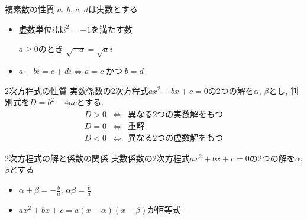 \documentclass[aspectratio=169, 12pt]{beamer} %
\begin{document}
\begin{frame}{複素数の性質}
    $a$, $b$, $c$, $d$は実数とする
    \begin{itemize}
        \item 虚数単位$i$は$i^2=-1$を満たす数 \par
              $a\geq 0$のとき $\sqrt{-a}=\sqrt{a}i$ \par
        \item $a+bi=c+di \Leftrightarrow a=c \; かつ\; b=d$
    \end{itemize}
\end{frame}
\begin{frame}{2次方程式の性質}
    実数係数の2次方程式$ax^2+bx+c=0$の2つの解を$\alpha$, $\beta$とし, 判別式を$D=b^2-4ac$とする.
    \begin{eqnarray*}
        D>0 &\Leftrightarrow& 異なる2つの実数解をもつ \\
        D=0&\Leftrightarrow& 重解 \\
        D<0&\Leftrightarrow& 異なる2つの虚数解をもつ
    \end{eqnarray*}
\end{frame}
\begin{frame}{2次方程式の解と係数の関係}
    実数係数の2次方程式$ax^2+bx+c=0$の2つの解を$\alpha$, $\beta$とする
    \begin{itemize}
        \item $\alpha+\beta=-\frac{b}{a}$, $\alpha\beta=\frac{c}{a}$
        \item $ax^2+bx+c=a(x-\alpha)(x-\beta)$が恒等式
    \end{itemize}
\end{frame}
\end{document}
